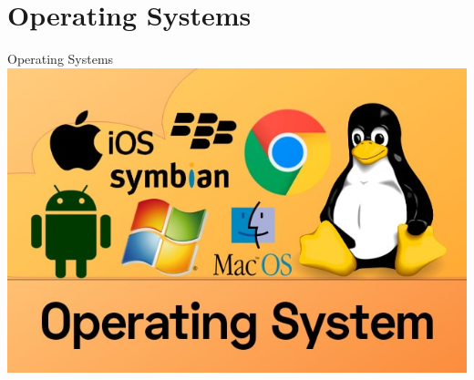 \documentclass[11pt]{beamer}
\begin{document}
\section[Operating Systems]{Operating Systems}
\begin{frame}{Operating Systems}
\center
\includegraphics[scale=0.35]{OS.jpeg}
\end{frame}
\end{document}
